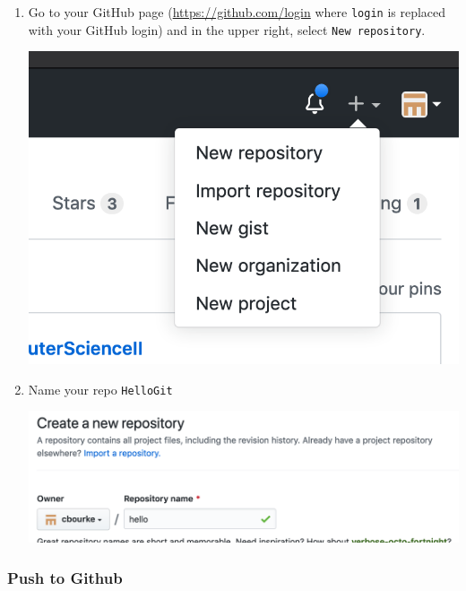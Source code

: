 \documentclass[12pt]{scrartcl}
\begin{document}
\begin{enumerate}
  \item Go to your GitHub page (\url{https://github.com/login}
  where \texttt{login} is replaced with your GitHub
  login) and in the upper right, select \texttt{New repository}.

  \begin{center}
  \includegraphics[scale=0.50]{./hack1.0-files/cl-githubNewRepo.png}
  \end{center}

  \item Name your repo \texttt{HelloGit}
  \begin{center}
  \includegraphics[scale=0.50]{./hack1.0-files/cl-githubNewRepoName.png}
  \end{center}
\end{enumerate}

\subsubsection{Push to Github}
\end{document}
